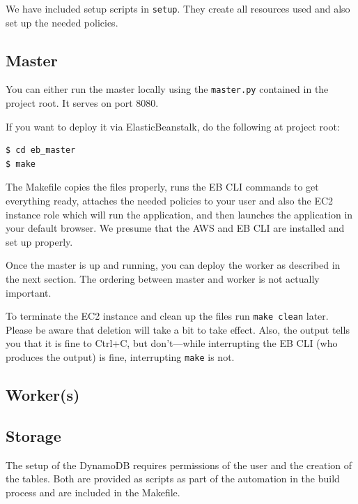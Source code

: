\documentclass[english]{scrartcl}
\begin{document}
We have included setup scripts in \texttt{setup}. They create all resources
used and also set up the needed policies. %

\subsection{Master}

You can either run the master locally using the \texttt{master.py} contained
in the project root. It serves on port 8080.

If you want to deploy it via ElasticBeanstalk, do the following at project
root:

\begin{verbatim}
$ cd eb_master
$ make
\end{verbatim}

The Makefile copies the files properly, runs the EB CLI commands to get
everything ready, attaches the needed policies to your user and also the EC2
instance role which will run the application, and then launches the application
in your default browser. We presume that the AWS and EB CLI are installed and
set up properly.

Once the master is up and running, you can deploy the worker as described in
the next section. The ordering between master and worker is not actually
important.

To terminate the EC2 instance and clean up the files run \texttt{make clean}
later. Please be aware that deletion will take a bit to take effect. Also, the
output tells you that it is fine to Ctrl+C, but don't---while interrupting the
EB CLI (who produces the output) is fine, interrupting \texttt{make} is not.

\subsection{Worker(s)}

\subsection{Storage}
The setup of the DynamoDB requires permissions of the user and the creation of the tables.
Both are provided as scripts as part of the automation in the build process and are included in the Makefile.
\end{document}
